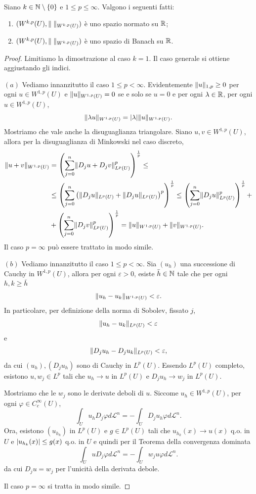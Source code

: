 \begin{teorema}
	Siano $k \in \mathbb{N}\setminus\left\lbrace 0\right\rbrace $ e $1\le p \le \infty$.	Valgono i seguenti fatti:
	\begin{enumerate}[$(a)$]
		\item $(W^{k,p}(U), \lVert\;\rVert_{W^{k,p}(U)})$ è uno spazio normato su $\mathbb{R}$;
		\item $(W^{k,p}(U), \lVert\;\rVert_{W^{k,p}(U)})$ è uno spazio di Banach su $\mathbb{R}$.
	\end{enumerate}
\end{teorema}
\begin{proof} Limitiamo la dimostrazione al caso $k = 1$. Il caso generale si ottiene aggiustando gli indici.
	\par\noindent
	$(a)$ Vediamo innanzitutto il caso $1 \le p < \infty$. Evidentemente $\lVert u\rVert_{1,p} \ge 0$ per ogni $u \in W^{1,p}(U)$ e $\lVert u\rVert_{W^{1,p}(U)} = 0 $ se e solo se $u = 0$ e per ogni $\lambda \in \mathbb{R}$, per ogni $u \in W^{1,p}(U)$, 
	\[ \lVert\lambda u\rVert_{W^{1,p}(U)} = \lvert\lambda\rvert \lVert u\rVert_{W^{1,p}(U)}. \]
	Mostriamo che vale anche la disuguaglianza triangolare. Siano $u,v \in W^{1,p}(U)$, allora per la disuguaglianza di Minkowski nel caso discreto,
	\begin{align*}
		\lVert u+v\rVert_{W^{1,p}(U)} &= \left( \sum_{j = 0}^{n} \lVert D_j u + D_j v\rVert_{L^p(U)}^p\right) ^{\frac{1}{p}} \le \\
		&\le \left( \sum_{j=0}^{n} \left( \lVert D_ju\rVert_{L^p(U)}+ \lVert D_ju\rVert_{L^p(U)}\right) ^p\right)^{\frac{1}{p}} \le \left( \sum_{j = 0}^{n} \lVert D_j u\rVert_{L^p(U)}^p\right) ^{\frac{1}{p}} +  \\
		&+\left( \sum_{j = 0}^{n} \lVert D_j v\rVert_{L^p(U)}^p\right) ^{\frac{1}{p}} = \lVert u\rVert_{W^{1,p}(U)} + \lVert v\rVert_{W^{1,p}(U)}.
	\end{align*}
	Il caso $p = \infty$ può essere trattato in modo simile.
	\par\noindent
	$(b)$ Vediamo innanzitutto il caso $1 \le p < \infty$. Sia $(u_h)$ una successione di Cauchy in $W^{1,p}(U)$, allora per ogni $\varepsilon > 0$, esiste $\bar{h} \in \mathbb{N}$ tale che per ogni $h,k \ge \bar{h}$
	\[ \lVert u_h - u_k\rVert_{W^{1,p}(U)} < \varepsilon. \]
	In particolare, per definizione della norma di Sobolev, fissato $j$,
	\[ \lVert u_h - u_k\rVert_{L^p(U)} < \varepsilon \]
	e 
	\[ \lVert D_ju_h - D_ju_k\rVert_{L^p(U)} < \varepsilon, \]
	da cui $(u_h), (D_ju_h)$ sono di Cauchy in $L^p(U)$. Essendo $L^p(U)$ completo, esistono $u, w_j \in L^p$ tali che $u_h \to u$ in $L^p(U)$ e $D_ju_h \to w_j$ in $L^p(U)$. 
	
	Mostriamo che le $w_j$ sono le derivate deboli di $u$. Siccome $u_h \in W^{1,p}(U)$, per ogni $\varphi \in C^\infty_c(U)$,
	\[ \int_U u_h D_j\varphi d\mathcal{L}^n = - \int_{U}D_j u_h \varphi d\mathcal{L}^n. \]
	Ora, esistono $(u_{h_{k}})$ in $L^p(U)$ e $g \in L^p(U)$ tali che $u_{h_{k}}(x) \to u(x)$ q.o. in $U$ e $\lvert u_{h_{k}}(x)\rvert \le g(x)$ q.o. in $U$ e quindi per il Teorema della convergenza dominata
	\[ \int_U uD_j\varphi d\mathcal{L}^n = - \int_{U}w_j u \varphi d\mathcal{L}^n. \]
	da cui $D_j u = w_j$ per l'unicità della derivata debole.
	
	Il caso $p = \infty$ si tratta in modo simile.
\end{proof}
